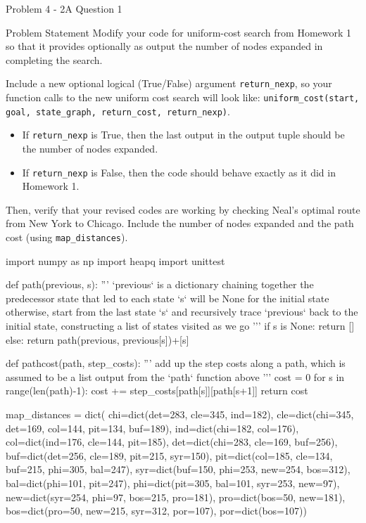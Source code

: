 \begin{problem}{Problem 4 - 2A Question 1}
    \begin{statement}{Problem Statement}
        Modify your code for uniform-cost search from Homework 1 so that it provides optionally as output the number of nodes expanded in completing the search.

        Include a new optional logical (True/False) argument \texttt{return\_nexp}, so your function calls to the new uniform cost search will look like: \texttt{uniform\_cost(start, goal, state\_graph, return\_cost, return\_nexp)}.

        \begin{itemize}
            \item If \texttt{return\_nexp} is True, then the last output in the output tuple should be the number of nodes expanded.
            \item If \texttt{return\_nexp} is False, then the code should behave exactly as it did in Homework 1.
        \end{itemize}

        Then, verify that your revised codes are working by checking Neal's optimal route from New York to Chicago. Include the number of nodes expanded and the path cost (using \texttt{map\_distances}).
    \end{statement}

    \begin{highlight}[Solution]
    \begin{code}[Python]
    import numpy as np
    import heapq
    import unittest
    
    def path(previous, s): 
        '''
        `previous` is a dictionary chaining together the predecessor state that led to each state
        `s` will be None for the initial state
        otherwise, start from the last state `s` and recursively trace `previous` back to the initial state,
        constructing a list of states visited as we go
        '''
        if s is None:
            return []
        else:
            return path(previous, previous[s])+[s]
    
    def pathcost(path, step_costs):
        '''
        add up the step costs along a path, which is assumed to be a list output from the `path` function above
        '''
        cost = 0
        for s in range(len(path)-1):
            cost += step_costs[path[s]][path[s+1]]
        return cost
    
    map_distances = dict(
        chi=dict(det=283, cle=345, ind=182),
        cle=dict(chi=345, det=169, col=144, pit=134, buf=189),
        ind=dict(chi=182, col=176),
        col=dict(ind=176, cle=144, pit=185),
        det=dict(chi=283, cle=169, buf=256),
        buf=dict(det=256, cle=189, pit=215, syr=150),
        pit=dict(col=185, cle=134, buf=215, phi=305, bal=247),
        syr=dict(buf=150, phi=253, new=254, bos=312),
        bal=dict(phi=101, pit=247),
        phi=dict(pit=305, bal=101, syr=253, new=97),
        new=dict(syr=254, phi=97, bos=215, pro=181),
        pro=dict(bos=50, new=181),
        bos=dict(pro=50, new=215, syr=312, por=107),
        por=dict(bos=107))
    

\end{code}
\end{highlight}
\end{problem}
